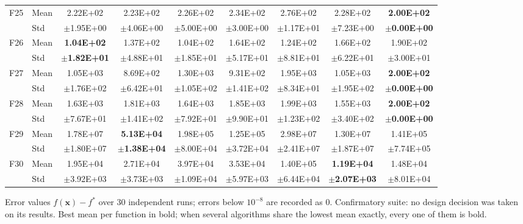 \begin{table}[htbp]
{\begin{tabular}{clccccccc}
F25 & Mean & 2.22E+02 & 2.23E+02 & 2.26E+02 & 2.34E+02 & 2.76E+02 & 2.28E+02 & \textbf{2.00E+02} \\
 & Std & $\pm$1.95E+00 & $\pm$4.06E+00 & $\pm$5.00E+00 & $\pm$3.00E+00 & $\pm$1.17E+01 & $\pm$7.23E+00 & $\pm$\textbf{0.00E+00} \\
F26 & Mean & \textbf{1.04E+02} & 1.37E+02 & 1.04E+02 & 1.64E+02 & 1.24E+02 & 1.66E+02 & 1.90E+02 \\
 & Std & $\pm$\textbf{1.82E+01} & $\pm$4.88E+01 & $\pm$1.85E+01 & $\pm$5.17E+01 & $\pm$8.81E+01 & $\pm$6.22E+01 & $\pm$3.00E+01 \\
F27 & Mean & 1.05E+03 & 8.69E+02 & 1.30E+03 & 9.31E+02 & 1.95E+03 & 1.05E+03 & \textbf{2.00E+02} \\
 & Std & $\pm$1.76E+02 & $\pm$6.42E+01 & $\pm$1.05E+02 & $\pm$1.41E+02 & $\pm$8.34E+01 & $\pm$1.95E+02 & $\pm$\textbf{0.00E+00} \\
F28 & Mean & 1.63E+03 & 1.81E+03 & 1.64E+03 & 1.85E+03 & 1.99E+03 & 1.55E+03 & \textbf{2.00E+02} \\
 & Std & $\pm$7.67E+01 & $\pm$1.41E+02 & $\pm$7.92E+01 & $\pm$9.90E+01 & $\pm$1.23E+02 & $\pm$3.40E+02 & $\pm$\textbf{0.00E+00} \\
F29 & Mean & 1.78E+07 & \textbf{5.13E+04} & 1.98E+05 & 1.25E+05 & 2.98E+07 & 1.30E+07 & 1.41E+05 \\
 & Std & $\pm$1.80E+07 & $\pm$\textbf{1.38E+04} & $\pm$8.00E+04 & $\pm$3.72E+04 & $\pm$2.41E+07 & $\pm$1.87E+07 & $\pm$7.74E+05 \\
F30 & Mean & 1.95E+04 & 2.71E+04 & 3.97E+04 & 3.53E+04 & 1.40E+05 & \textbf{1.19E+04} & 1.48E+04 \\
 & Std & $\pm$3.92E+03 & $\pm$3.73E+03 & $\pm$1.09E+04 & $\pm$5.97E+03 & $\pm$6.44E+04 & $\pm$\textbf{2.07E+03} & $\pm$8.01E+04 \\
\bottomrule
\end{tabular}}
\begin{flushleft}\footnotesize
Error values $f(\mathbf{x})-f^{*}$ over 30 independent runs; errors below $10^{-8}$ are recorded as 0. Confirmatory suite: no design decision was taken on its results. Best mean per function in bold; when several algorithms share the lowest mean exactly, every one of them is bold.
\end{flushleft}
\end{table}

